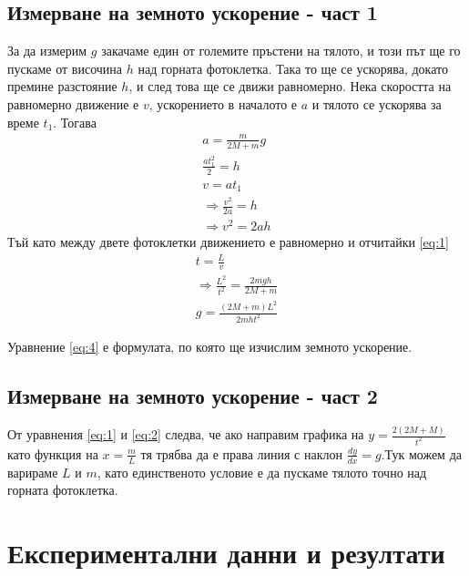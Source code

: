 \documentclass[aps, prb, twocolumn, a4paper, floatfix, reprint]{revtex4-2}
\begin{document}
\subsection{Измерване на земното ускорение - част 1}
За да измерим $g$ закачаме един от големите пръстени на тялото, и този път ще го пускаме от височина $h$ над горната фотоклетка. Така то ще се ускорява, докато премине разстояние $h$, и след това ще се движи равномерно. Нека скоростта на равномерно движение е $v$, ускорението в началото е $a$ и тялото се ускорява за време $t_1$. Тогава 
\begin{gather*}
    a = \frac{m}{2M + m} g\\
    \frac{at_1^2}{2} = h\\
    v = at_1 \\
    \Rightarrow \frac{v^2}{2a} = h\\
    \Rightarrow v^2 = 2ah\label{eq:3} \tag{3}
\end{gather*} 
Тъй като между двете фотоклетки движението е равномерно и отчитайки \eqref{eq:1} 
\begin{gather*}
    t = \frac{L}{v} \\
    \Rightarrow \frac{L^2}{t^2} = \frac{2mgh}{2M + m} \\
    g = \frac{(2M + m)L^2}{2mht^2} \label{eq:4} \tag{4}
\end{gather*}

Уравнение \eqref{eq:4} е формулата, по която ще изчислим земното ускорение.

\subsection{Измерване на земното ускорение - част 2}
От уравнения \eqref{eq:1} и \eqref{eq:2} следва, че ако направим графика на $y=\frac{2(2M + M)}{t^2}$ като функция на $x=\frac{m}{L}$ тя трябва да е права линия с наклон $\frac{dy}{dx} = g$.Тук можем да варираме $L$ и $m$, като единственото условие е да пускаме тялото точно над горната фотоклетка.


\section{Експериментални данни и резултати}
\end{document}
